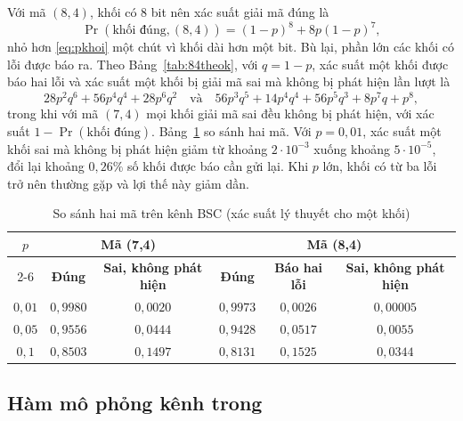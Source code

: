 Với mã $(8,4)$, khối có $8$ bit nên xác suất giải mã đúng là
\begin{equation}\label{eq:pkhoi84}
  \Pr(\text{khối đúng}, (8,4)) = (1-p)^8 + 8p(1-p)^7 ,
\end{equation}
nhỏ hơn \eqref{eq:pkhoi} một chút vì khối dài hơn một bit. Bù lại, phần lớn các
khối có lỗi được báo ra. Theo Bảng~\ref{tab:84theok}, với $q = 1 - p$, xác suất
một khối được báo hai lỗi và xác suất một khối bị giải mã sai mà không bị phát
hiện lần lượt là
\[
  28p^2q^6 + 56p^4q^4 + 28p^6q^2
  \quad\text{và}\quad
  56p^3q^5 + 14p^4q^4 + 56p^5q^3 + 8p^7q + p^8 ,
\]
trong khi với mã $(7,4)$ mọi khối giải mã sai đều không bị phát hiện, với xác
suất $1 - \Pr(\text{khối đúng})$. Bảng~\ref{tab:haima-p} so sánh hai mã. Với
$p = 0{,}01$, xác suất một khối sai mà không bị phát hiện giảm từ khoảng
$2 \cdot 10^{-3}$ xuống khoảng $5 \cdot 10^{-5}$, đổi lại khoảng $0{,}26\%$ số
khối được báo cần gửi lại. Khi $p$ lớn, khối có từ ba lỗi trở nên thường gặp và
lợi thế này giảm dần.

\begin{table}[H]
\centering\small\renewcommand{\arraystretch}{1.1}
\caption{So sánh hai mã trên kênh BSC (xác suất lý thuyết cho một khối)}
\label{tab:haima-p}
\begin{tabular}{|c|c|c|c|c|c|}
\hline
\multirow{2}{*}{$p$} & \multicolumn{2}{c|}{\textbf{Mã (7,4)}} &
  \multicolumn{3}{c|}{\textbf{Mã (8,4)}}\\ \cline{2-6}
 & \textbf{Đúng} & \textbf{Sai, không phát hiện} & \textbf{Đúng} &
  \textbf{Báo hai lỗi} & \textbf{Sai, không phát hiện}\\ \hline
$0{,}01$ & $0{,}9980$ & $0{,}0020$ & $0{,}9973$ & $0{,}0026$ & $0{,}00005$\\ \hline
$0{,}05$ & $0{,}9556$ & $0{,}0444$ & $0{,}9428$ & $0{,}0517$ & $0{,}0055$\\ \hline
$0{,}1$  & $0{,}8503$ & $0{,}1497$ & $0{,}8131$ & $0{,}1525$ & $0{,}0344$\\ \hline
\end{tabular}
\end{table}

\subsection{Hàm mô phỏng kênh trong }
\label{ss:4.4.4}

